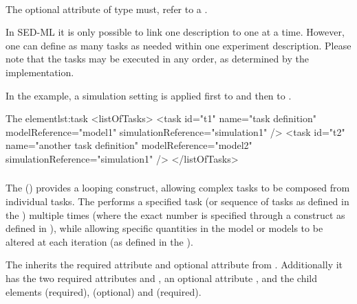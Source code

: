 \paragraph*{}
The optional  attribute of type \SIdRef must,  refer to a \Simulation.  

In SED-ML it is only possible to link one \Simulation description to one \Model at a time. However, one can define as many tasks as needed within one experiment description. Please note that the tasks may be executed in any order, as determined by the implementation.


In the example, a simulation setting  is applied first to  and then to .
\begin{myXmlLst}{The  element}{lst:task}
<listOfTasks>
	<task id="t1" name="task definition" modelReference="model1" 
		simulationReference="simulation1" />
	<task id="t2" name="another task definition" modelReference="model2" 
		simulationReference="simulation1" />
</listOfTasks>
\end{myXmlLst}


\subsubsection{}
\label{class:repeatedTask}
The  () provides a looping construct, allowing complex tasks to be composed from individual tasks. The  performs a specified task (or sequence of tasks as defined in the \hyperref[class:listOfSubTasks]{}) multiple times (where the exact number is specified through a \Range construct as defined in \hyperref[sec:rangeAttribute]{}), while allowing specific quantities in the model or models to be altered at each iteration (as defined in the \hyperref[sec:changesRepeatedTask]{}).


The  inherits the required attribute \hyperref[sec:id]{} and optional attribute \hyperref[sec:name]{} from \AbstractTask. Additionally it has the two required attributes \hyperref[sec:rangeAttribute]{} and \hyperref[sec:resetModel]{}, an optional attribute \hyperref[sec:concatenateAttribute]{}, and the child elements \hyperref[class:listOfRanges]{} (required), \hyperref[sec:changesRepeatedTask]{} (optional) and \hyperref[class:subTask]{} (required).

